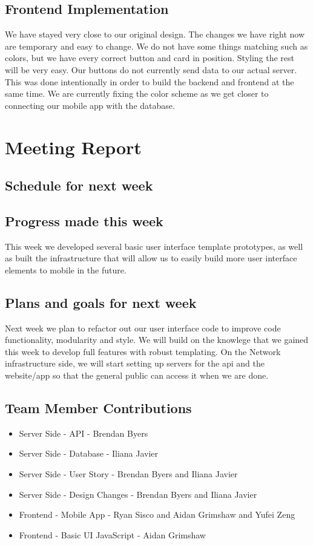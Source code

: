 \documentclass[12pt]{article}
\begin{document}
\subsection{Frontend Implementation}
We have stayed very close to our original design. The changes we have right now are temporary and easy to change. We do not have some things matching such as colors, but we have every correct button and card in position. Styling the rest will be very easy. Our buttons do not currently send data to our actual server. This was done intentionally in order to build the backend and frontend at the same time. We are currently fixing the color scheme as we get closer to connecting our mobile app with the database.
\section{Meeting Report}
\subsection{Schedule for next week}

\subsection{Progress made this week}
This week we developed several basic user interface template prototypes, as well as built the infrastructure that will allow us to easily build more user interface elements to mobile in the future.
\subsection{Plans and goals for next week}
Next week we plan to refactor out our user interface code to improve code functionality, modularity and style. We will build on the knowlege that we gained this week to develop full features with robust templating. On the Network infrastructure side, we will start setting up servers for the api and the website/app so that the general public can access it when we are done.
\subsection{Team Member Contributions}
\begin{itemize}
      \item Server Side - API - Brendan Byers
      \item Server Side - Database - Iliana Javier
      \item Server Side - User Story - Brendan Byers and Iliana Javier
      \item Server Side - Design Changes - Brendan Byers and Iliana Javier
      \item Frontend - Mobile App - Ryan Sisco and Aidan Grimshaw and Yufei Zeng
      \item Frontend - Basic UI JavaScript - Aidan Grimshaw
\end{itemize}
\end{document}
